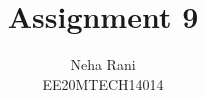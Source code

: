 \documentclass[journal,12pt,twocolumn]{IEEEtran}
\begin{document}
\makeatletter
{}
\makeatother
\let\StandardTheFigure\thefigure
\let\vec\mathbf
\renewcommand{\thefigure}{\theproblem}
\def\putbox#1#2#3{\makebox[0in][l]{\makebox[#1][l]{}\raisebox{\baselineskip}[0in][0in]{\raisebox{#2}[0in][0in]{#3}}}}
     \def\rightbox#1{\makebox[0in][r]{#1}}
     \def\centbox#1{\makebox[0in]{#1}}
     \def\topbox#1{\raisebox{-\baselineskip}[0in][0in]{#1}}
     \def\midbox#1{\raisebox{-0.5\baselineskip}[0in][0in]{#1}}
\vspace{3cm}
\title{Assignment 9}
\author{Neha Rani\\EE20MTECH14014}
%
%
%
% 
%
\end{document}
